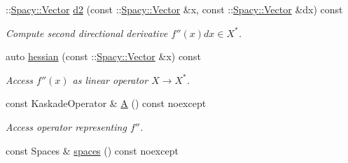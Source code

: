 \begin{DoxyCompactItemize}
\-::\hyperlink{classSpacy_1_1Vector}{\-Spacy\-::\-Vector} \hyperlink{classSpacy_1_1Kaskade_1_1C2Functional_a7bd6c110c1f954a92f43f6035787a9f0}{d2} (const \-::\hyperlink{classSpacy_1_1Vector}{\-Spacy\-::\-Vector} \&x, const \-::\hyperlink{classSpacy_1_1Vector}{\-Spacy\-::\-Vector} \&dx) const 
\begin{DoxyCompactList}\small\item\em \-Compute second directional derivative $f''(x)dx\in X^* $. \end{DoxyCompactList}\item 
auto \hyperlink{classSpacy_1_1Kaskade_1_1C2Functional_a73e0b9a2499e89bf85eddf1aa74fe9ba}{hessian} (const \-::\hyperlink{classSpacy_1_1Vector}{\-Spacy\-::\-Vector} \&x) const 
\begin{DoxyCompactList}\small\item\em \-Access $f''(x)$ as linear operator $X\rightarrow X^*$. \end{DoxyCompactList}\item 
\hypertarget{classSpacy_1_1Kaskade_1_1C2Functional_ab45aa1c81e4698b642a5381a9b6be14b}{const \-Kaskade\-Operator \& \hyperlink{classSpacy_1_1Kaskade_1_1C2Functional_ab45aa1c81e4698b642a5381a9b6be14b}{\-A} () const noexcept}\label{classSpacy_1_1Kaskade_1_1C2Functional_ab45aa1c81e4698b642a5381a9b6be14b}

\begin{DoxyCompactList}\small\item\em \-Access operator representing $f''$. \end{DoxyCompactList}\item 
\hypertarget{classSpacy_1_1Kaskade_1_1C2Functional_ac334455723ea59d001fef33e056b1ea7}{const \-Spaces \& \hyperlink{classSpacy_1_1Kaskade_1_1C2Functional_ac334455723ea59d001fef33e056b1ea7}{spaces} () const noexcept}\label{classSpacy_1_1Kaskade_1_1C2Functional_ac334455723ea59d001fef33e056b1ea7}


\end{DoxyCompactItemize}
